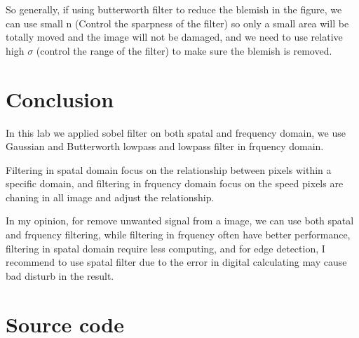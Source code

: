 \documentclass[
	12pt, %
]{style/fphw}
\begin{document}
So generally, if using butterworth filter to reduce the blemish in the figure, we can use small n (Control the sparpness of the filter) so only a small area will be totally moved and the image will not be damaged, and we need to use relative high $\sigma$ (control the range of the filter) to make sure the blemish is removed.

\section*{Conclusion}

In this lab we applied sobel filter on both spatal and frequency domain, we use Gaussian and Butterworth lowpass and lowpass filter in frquency domain. 

Filtering in spatal domain focus on the relationship between pixels within a specific domain, and filtering in frquency domain focus on the speed pixels are chaning in all image and adjust the relationship. 

In my opinion, for remove unwanted signal from a image, we can use both spatal and frquency filtering, while filtering in frquency often have better performance, filtering in spatal domain require less computing, and for edge detection, I recommend to use spatal filter due to the error in digital calculating may cause bad disturb in the result.

\newpage
\section*{Source code}

\inputminted[linenos,breaklines, breakafter=d, bgcolor=bg]{python}{code/EE326_SUSTech.py}

\inputminted[linenos,breaklines, breakafter=d, bgcolor=bg]{python}{code/sobel_filter_11810818.py}

\inputminted[linenos,breaklines, breakafter=d, bgcolor=bg]{python}{code/gaussian_pass_11810818.py}

\inputminted[linenos,breaklines, breakafter=d, bgcolor=bg]{python}{code/butterworth_notch_filters_11810818.py}
\end{document}
